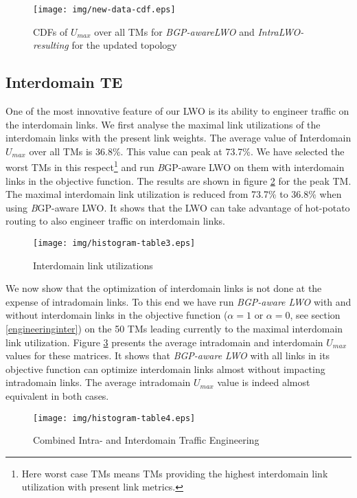 \documentclass{acm_proc_article-sp}
\begin{document}
\begin{figure}[htbp]
  \centering
  \texttt{[image: img/new-data-cdf.eps]}
  \caption{CDFs of $U_{max}$ over all TMs  for \textit{BGP-awareLWO} and \textit{IntraLWO-resulting} for the updated topology}
  \label{fig:cdfUmaxUpdatedTopo}
\end{figure}

\subsection{Interdomain TE}
\label{sec:interdomainte}

One of the most innovative feature of our LWO is its ability to engineer traffic on the
interdomain links. We first analyse the maximal link utilizations of the
interdomain links with the present link weights. The
average value of Interdomain $U_{max}$ over all TMs is 36.8\%. 
This value can peak at 73.7\%. 
We have selected the worst TMs in this respect\footnote{ Here
    worst case TMs means TMs providing the highest interdomain link
    utilization with present link metrics.} and run {\textit BGP-aware LWO}
on them with interdomain links in the objective function. 
The results are shown in figure \ref{tab:interdomainte} for the peak TM. 
The maximal interdomain link utilization is reduced from 73.7\% to
36.8\% when using {\textit BGP-aware LWO}. It shows that the LWO can take advantage of hot-potato routing
to also engineer traffic on interdomain links.

\begin{figure}[htbp]
  \centering
  \texttt{[image: img/histogram-table3.eps]}
  \caption{Interdomain link utilizations}
  \label{tab:interdomainte}
\end{figure}

We now show that the optimization of interdomain links
is not done at the expense of intradomain links. 
To this end we have run {\it BGP-aware LWO} with and without
interdomain links in the objective function ($\alpha = 1$ or $\alpha = 0$, see section \ref{engineeringinter}) 
on the 50 TMs
leading currently to the maximal interdomain link
utilization. Figure \ref{tab:interdomainte2} presents the average
intradomain and interdomain $U_{max}$ values for these matrices.
It shows that \textit{BGP-aware LWO} with all links in its
objective function can optimize interdomain links almost without 
impacting intradomain links. The average
intradomain $U_{max}$ value is indeed almost equivalent in both cases.

\begin{figure}[htbp]
  \centering
  \texttt{[image: img/histogram-table4.eps]}
  \caption{Combined Intra- and Interdomain Traffic Engineering}
  \label{tab:interdomainte2}
\end{figure}
\end{document}
